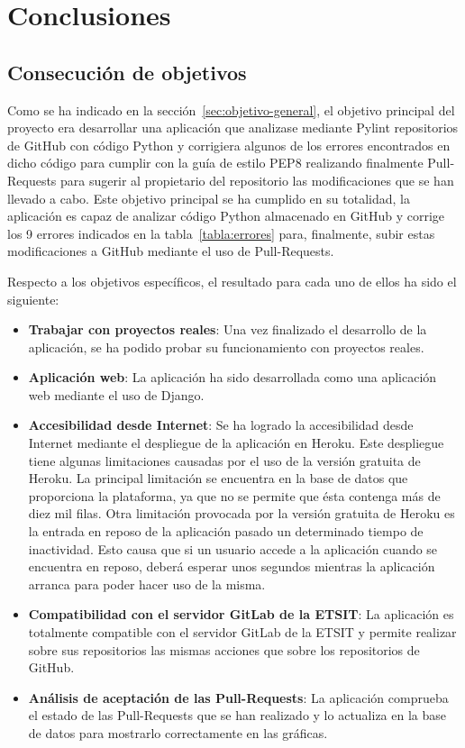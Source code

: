 \documentclass[a4paper, 12pt]{book}
\begin{document}
\cleardoublepage
\chapter{Conclusiones}
\label{chap:conclusiones}

\section{Consecución de objetivos}
\label{sec:consecucion-objetivos}

Como se ha indicado en la sección~\ref{sec:objetivo-general}, el objetivo principal del proyecto era desarrollar una aplicación que analizase mediante Pylint repositorios de GitHub con código Python y corrigiera algunos de los errores encontrados en dicho código para cumplir con la guía de estilo PEP8 realizando finalmente Pull-Requests para sugerir al propietario del repositorio las modificaciones que se han llevado a cabo.
Este objetivo principal se ha cumplido en su totalidad, la aplicación es capaz de analizar código Python almacenado en GitHub y corrige los 9 errores indicados en la tabla~\ref{tabla:errores} para, finalmente, subir estas modificaciones a GitHub mediante el uso de Pull-Requests.

Respecto a los objetivos específicos, el resultado para cada uno de ellos ha sido el siguiente:
\begin{itemize}
	\item \textbf{Trabajar con proyectos reales}: Una vez finalizado el desarrollo de la aplicación, se ha podido probar su funcionamiento con proyectos reales.
	\item \textbf{Aplicación web}: La aplicación ha sido desarrollada como una aplicación web mediante el uso de Django.
	\item \textbf{Accesibilidad desde Internet}: Se ha logrado la accesibilidad desde Internet mediante el despliegue de la aplicación en Heroku.
	Este despliegue tiene algunas limitaciones causadas por el uso de la versión gratuita de Heroku.
	La principal limitación se encuentra en la base de datos que proporciona la plataforma, ya que no se permite que ésta contenga más de diez mil filas.
	Otra limitación provocada por la versión gratuita de Heroku es la entrada en reposo de la aplicación pasado un determinado tiempo de inactividad.
	Esto causa que si un usuario accede a la aplicación cuando se encuentra en reposo, deberá esperar unos segundos mientras la aplicación arranca para poder hacer uso de la misma.
	\item \textbf{Compatibilidad con el servidor GitLab de la ETSIT}: La aplicación es totalmente compatible con el servidor GitLab de la ETSIT y permite realizar sobre sus repositorios las mismas acciones que sobre los repositorios de GitHub.
	\item \textbf{Análisis de aceptación de las Pull-Requests}: La aplicación comprueba el estado de las Pull-Requests que se han realizado y lo actualiza en la base de datos para mostrarlo correctamente en las gráficas.
\end{itemize}
\end{document}
